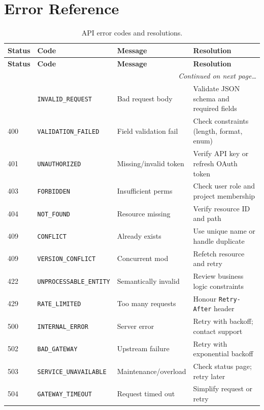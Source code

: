 \documentclass[
    language=english,
    doctype=article,
    institution=none,
]{../../omnilatex}
\begin{document}
\section{Error Reference}
\label{sec:errors}
\begin{longtable}{@{}lllp{4.5cm}@{}}
    \caption{API error codes and resolutions.}
    \label{tab:errors} \\
    \toprule
    \textbf{Status} & \textbf{Code} & \textbf{Message} & \textbf{Resolution} \\
    \midrule
    \endfirsthead
    \toprule
    \textbf{Status} & \textbf{Code} & \textbf{Message} & \textbf{Resolution} \\
    \midrule
    \endhead
    \midrule \multicolumn{4}{r}{\textit{Continued on next page\ldots}} \\ \endfoot
    \bottomrule \endlastfoot
    400 & \texttt{INVALID\_REQUEST}      & Bad request body      & Validate JSON schema and required fields \\
    400 & \texttt{VALIDATION\_FAILED}    & Field validation fail & Check constraints (length, format, enum) \\
    401 & \texttt{UNAUTHORIZED}          & Missing/invalid token & Verify API key or refresh OAuth token \\
    403 & \texttt{FORBIDDEN}             & Insufficient perms    & Check user role and project membership \\
    404 & \texttt{NOT\_FOUND}            & Resource missing      & Verify resource ID and path \\
    409 & \texttt{CONFLICT}              & Already exists        & Use unique name or handle duplicate \\
    409 & \texttt{VERSION\_CONFLICT}     & Concurrent mod        & Refetch resource and retry \\
    422 & \texttt{UNPROCESSABLE\_ENTITY} & Semantically invalid  & Review business logic constraints \\
    429 & \texttt{RATE\_LIMITED}         & Too many requests     & Honour \texttt{Retry-After} header \\
    500 & \texttt{INTERNAL\_ERROR}       & Server error          & Retry with backoff; contact support \\
    502 & \texttt{BAD\_GATEWAY}          & Upstream failure      & Retry with exponential backoff \\
    503 & \texttt{SERVICE\_UNAVAILABLE}  & Maintenance/overload  & Check status page; retry later \\
    504 & \texttt{GATEWAY\_TIMEOUT}      & Request timed out     & Simplify request or retry \\
\end{longtable}
\end{document}
